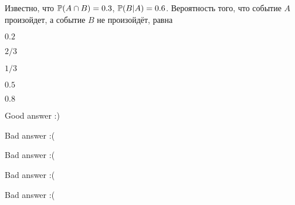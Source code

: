 
\begin{question}
Известно, что \(\P(A\cap B)= 0.3\), \(\P(B|A)=0.6\). Вероятность того,
что событие \(A\) произойдет, а событие \(B\) не произойдёт, равна
\begin{answerlist}
  \item \(0.2\)
  \item \(2/3\)
  \item \(1/3\)
  \item \(0.5\)
  \item \(0.8\)
\end{answerlist}
\end{question}

\begin{solution}
\begin{answerlist}
  \item Good answer :)
  \item Bad answer :(
  \item Bad answer :(
  \item Bad answer :(
  \item Bad answer :(
\end{answerlist}
\end{solution}

